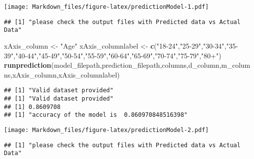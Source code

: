 \documentclass[
]{article}
\newenvironment{Shaded}{\begin{snugshade}}{\end{snugshade}}
\newcommand{\FunctionTok}[1]{\textcolor[rgb]{0.13,0.29,0.53}{\textbf{#1}}}
\newcommand{\NormalTok}[1]{#1}
\newcommand{\OtherTok}[1]{\textcolor[rgb]{0.56,0.35,0.01}{#1}}
\newcommand{\StringTok}[1]{\textcolor[rgb]{0.31,0.60,0.02}{#1}}
\begin{document}
\texttt{[image: Markdown\_files/figure-latex/predictionModel-1.pdf]}

\begin{verbatim}
## [1] "please check the output files with Predicted data vs Actual Data"
\end{verbatim}

\begin{Shaded}
\begin{Highlighting}[]
\NormalTok{xAxis\_column }\OtherTok{\textless{}{-}} \StringTok{"Age"}
\NormalTok{xAxis\_columnlabel }\OtherTok{\textless{}{-}} \FunctionTok{c}\NormalTok{(}\StringTok{"18{-}24"}\NormalTok{,}\StringTok{"25{-}29"}\NormalTok{,}\StringTok{"30{-}34"}\NormalTok{,}\StringTok{"35{-}39"}\NormalTok{,}\StringTok{"40{-}44"}\NormalTok{,}\StringTok{"45{-}49"}\NormalTok{,}\StringTok{"50{-}54"}\NormalTok{,}\StringTok{"55{-}59"}\NormalTok{,}\StringTok{"60{-}64"}\NormalTok{,}\StringTok{"65{-}69"}\NormalTok{,}\StringTok{"70{-}74"}\NormalTok{,}\StringTok{"75{-}79"}\NormalTok{,}\StringTok{"80+"}\NormalTok{)}
\FunctionTok{runprediction}\NormalTok{(model\_filepath,prediction\_filepath,columns,d\_column,m\_columns,xAxis\_column,xAxis\_columnlabel)}
\end{Highlighting}
\end{Shaded}

\begin{verbatim}
## [1] "Valid dataset provided"
## [1] "Valid dataset provided"
## [1] 0.8609708
## [1] "accuracy of the model is  0.860970848516398"
\end{verbatim}

\texttt{[image: Markdown\_files/figure-latex/predictionModel-2.pdf]}

\begin{verbatim}
## [1] "please check the output files with Predicted data vs Actual Data"
\end{verbatim}
\end{document}
